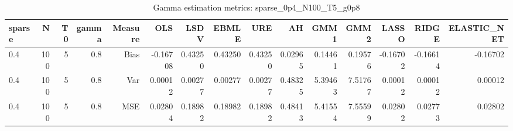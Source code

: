 \begin{table}[!htbp]\centering
\caption{Gamma estimation metrics: sparse_0p4_N100_T5_g0p8}
\label{tab:table1_sparse_0p4_N100_T5_g0p8}
\begin{tabular}{lrrrrrrrrrrrrrr}
\hline
sparse & N & T0 & gamma & Measure & OLS & LSDV & EBMLE & URE & AH & GMM1 & GMM2 & LASSO & RIDGE & ELASTIC_NET \\
\hline
0.4 & 100 & 5 & 0.8 & Bias & -0.16708 & 0.43250 & 0.43250 & 0.43250 & 0.02965 & 0.14461 & 0.19576 & -0.16702 & -0.16614 & -0.16702 \\
0.4 & 100 & 5 & 0.8 & Var & 0.00012 & 0.00277 & 0.00277 & 0.00277 & 0.48325 & 5.39463 & 7.51767 & 0.00012 & 0.00012 & 0.00012 \\
0.4 & 100 & 5 & 0.8 & MSE & 0.02804 & 0.18982 & 0.18982 & 0.18982 & 0.48413 & 5.41554 & 7.55599 & 0.02802 & 0.02773 & 0.02802 \\
\hline
\end{tabular}
\end{table}

